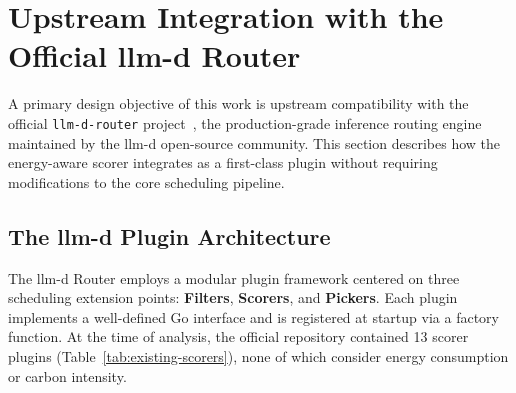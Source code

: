 %



\section{Upstream Integration with the Official llm-d Router}
\label{sec:upstream-integration}

A primary design objective of this work is upstream compatibility with the official \texttt{llm-d-router} project~\cite{llm-d-router}, the production-grade inference routing engine maintained by the llm-d open-source community. This section describes how the energy-aware scorer integrates as a first-class plugin without requiring modifications to the core scheduling pipeline.

\subsection{The llm-d Plugin Architecture}
\label{subsec:plugin-architecture}

The llm-d Router employs a modular plugin framework centered on three scheduling extension points: \textbf{Filters}, \textbf{Scorers}, and \textbf{Pickers}. Each plugin implements a well-defined Go interface and is registered at startup via a factory function. At the time of analysis, the official repository contained 13 scorer plugins (Table~\ref{tab:existing-scorers}), none of which consider energy consumption or carbon intensity.

